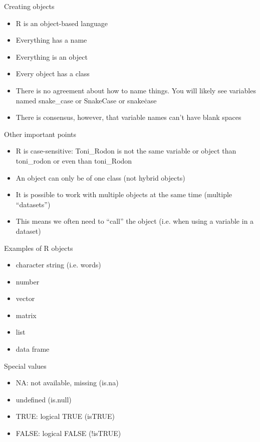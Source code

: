 \documentclass{beamer}
\begin{document}
 \begin{frame}{Creating objects}
\begin{itemize}[<+->]
\item R is an object-based language
\item Everything has a name
\item Everything is an object
\item Every object has a class
\item There is no agreement about how to name things. You will likely see variables named snake\_case or SnakeCase or snake\.case
\item There is consensus, however, that variable names can't have blank spaces
   \end{itemize} 
\end{frame}


 \begin{frame}{Other important points}
\begin{itemize}[<+->]
\item R is case-sensitive: Toni\_Rodon is not the same variable or object than toni\_rodon or even than toni\_Rodon
\item An object can only be of one class (not hybrid objects)
\item It is possible to work with multiple objects at the same time (multiple ``datasets'')
\item This means we often need to ``call'' the object (i.e. when using a variable in a dataset) 
   \end{itemize} 
\end{frame}

 \begin{frame}{Examples of R objects}
\begin{itemize}[<+->]
\item character string (i.e. words)
\item number
\item vector
\item matrix
\item list
\item data frame
   \end{itemize} 
\end{frame}

 \begin{frame}{Special values}
\begin{itemize}[<+->]
\item NA: not available, missing (is.na)
\item undefined (is.null)
\item TRUE: logical TRUE (isTRUE)
\item FALSE: logical FALSE (!isTRUE)
   \end{itemize} 
\end{frame}
\end{document}
